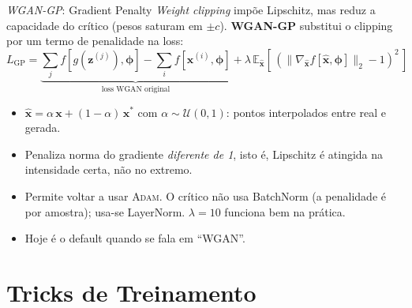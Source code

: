 \documentclass[aspectratio=169,xcolor=dvipsnames]{beamer}
\begin{document}
  \begin{frame}{\textit{WGAN-GP}: Gradient Penalty}
    \emph{Weight clipping} impõe Lipschitz, mas reduz a capacidade do
    crítico (pesos saturam em $\pm c$). \textbf{WGAN-GP} substitui o
    clipping por um termo de penalidade na loss:
    \vspace{0.3em}
    \[
      L_{\text{GP}} =
      \underbrace{\sum_{j} f[g(\mathbf{z}^{(j)}),\bm{\phi}] - \sum_{i} f[\mathbf{x}^{(i)},\bm{\phi}]}_{\text{loss WGAN original}}
      + \lambda\,\mathbb{E}_{\hat{\mathbf{x}}}\!\left[\,\left(\|\nabla_{\hat{\mathbf{x}}} f[\hat{\mathbf{x}},\bm{\phi}]\|_{2} - 1\right)^{2}\,\right]
    \]
    \vspace{0.2em}
    \begin{itemize}
      \item $\hat{\mathbf{x}} = \alpha\,\mathbf{x} + (1-\alpha)\,\mathbf{x}^{*}$ com
      $\alpha \sim \mathcal{U}(0,1)$: pontos interpolados entre real e
      gerada.
      \item Penaliza norma do gradiente \emph{diferente de 1}, isto é,
      Lipschitz é atingida na intensidade certa, não no extremo.
      \item Permite voltar a usar \textsc{Adam}. O crítico não usa BatchNorm
      (a penalidade é por amostra); usa-se LayerNorm. $\lambda = 10$
      funciona bem na prática.
      \item Hoje é o default quando se fala em ``WGAN''.
    \end{itemize}
  \end{frame}

  \section{Tricks de Treinamento}
\end{document}
